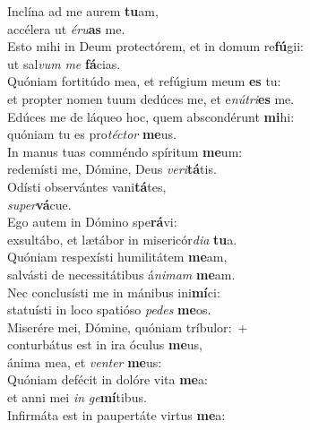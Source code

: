 \evenverse Inclína ad me aurem \textbf{tu}am,~\*\\
\evenverse accélera ut \textit{é}\textit{ru}\textbf{as} me.\\
\oddverse Esto mihi in Deum protectórem, et in domum re\textbf{fú}gii:~\*\\
\oddverse ut sal\textit{vum} \textit{me} \textbf{fá}cias.\\
\evenverse Quóniam fortitúdo mea, et refúgium meum \textbf{es} tu:~\*\\
\evenverse et propter nomen tuum dedúces me, et e\textit{nú}\textit{tri}\textbf{es} me.\\
\oddverse Edúces me de láqueo hoc, quem abscondérunt \textbf{mi}hi:~\*\\
\oddverse quóniam tu es pro\textit{té}\textit{ctor} \textbf{me}us.\\
\evenverse In manus tuas comméndo spíritum \textbf{me}um:~\*\\
\evenverse redemísti me, Dómine, Deus \textit{ve}\textit{ri}\textbf{tá}tis.\\
\oddverse Odísti observántes vani\textbf{tá}tes,~\*\\
\oddverse \textit{su}\textit{per}\textbf{vá}cue.\\
\evenverse Ego autem in Dómino spe\textbf{rá}vi:~\*\\
\evenverse exsultábo, et lætábor in misericór\textit{di}\textit{a} \textbf{tu}a.\\
\oddverse Quóniam respexísti humilitátem \textbf{me}am,~\*\\
\oddverse salvásti de necessitátibus á\textit{ni}\textit{mam} \textbf{me}am.\\
\evenverse Nec conclusísti me in mánibus ini\textbf{mí}ci:~\*\\
\evenverse statuísti in loco spatióso \textit{pe}\textit{des} \textbf{me}os.\\
\oddverse Miserére mei, Dómine, quóniam tríbulor:~+\\
\oddverse  conturbátus est in ira óculus \textbf{me}us,~\*\\
\oddverse ánima mea, et \textit{ven}\textit{ter} \textbf{me}us:\\
\evenverse Quóniam defécit in dolóre vita \textbf{me}a:~\*\\
\evenverse et anni mei \textit{in} \textit{ge}\textbf{mí}tibus.\\
\oddverse Infirmáta est in paupertáte virtus \textbf{me}a:~\*\\
